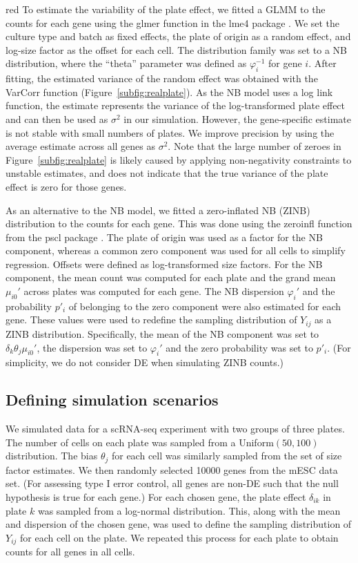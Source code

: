 \documentclass{article}
\begin{document}
\begin{color}{red}
To estimate the variability of the plate effect, we fitted a GLMM to the counts for each gene using the glmer function in the lme4 package \citep{bates2015fitting}.
We set the culture type and batch as fixed effects, the plate of origin as a random effect, and log-size factor as the offset for each cell.
The distribution family was set to a NB distribution, where the ``theta'' parameter was defined as $\varphi_i^{-1}$ for gene $i$.
After fitting, the estimated variance of the random effect was obtained with the VarCorr function (Figure~\ref{subfig:realplate}).
As the NB model uses a log link function, the estimate represents the variance of the log-transformed plate effect and can then be used as $\sigma^2$ in our simulation.
However, the gene-specific estimate is not stable with small numbers of plates.
We improve precision by using the average estimate across all genes as $\sigma^2$.
Note that the large number of zeroes in Figure~\ref{subfig:realplate} is likely caused by applying non-negativity constraints to unstable estimates, and does not indicate that the true variance of the plate effect is zero for those genes. 

As an alternative to the NB model, we fitted a zero-inflated NB (ZINB) distribution to the counts for each gene.
This was done using the zeroinfl function from the pscl package \citep{zeilis2008regression}.
The plate of origin was used as a factor for the NB component, whereas a common zero component was used for all cells to simplify regression.
Offsets were defined as log-transformed size factors.
For the NB component, the mean count was computed for each plate and the grand mean $\mu_{i0}'$ across plates was computed for each gene.
The NB dispersion $\varphi_i'$ and the probability $p'_i$ of belonging to the zero component were also estimated for each gene.
These values were used to redefine the sampling distribution of $Y_{ij}$ as a ZINB distribution.
Specifically, the mean of the NB component was set to $\delta_k\theta_j\mu_{i0}'$, the dispersion was set to $\varphi_i'$ and the zero probability was set to $p'_i$.
(For simplicity, we do not consider DE when simulating ZINB counts.)

\subsection{Defining simulation scenarios}
We simulated data for a scRNA-seq experiment with two groups of three plates.
The number of cells on each plate was sampled from a Uniform$(50, 100)$ distribution.
The bias $\theta_j$ for each cell was similarly sampled from the set of size factor estimates.
We then randomly selected 10000 genes from the mESC data set.
(For assessing type I error control, all genes are non-DE such that the null hypothesis is true for each gene.)
For each chosen gene, the plate effect $\delta_{ik}$ in plate $k$ was sampled from a log-normal distribution.
This, along with the mean and dispersion of the chosen gene, was used to define the sampling distribution of $Y_{ij}$ for each cell on the plate.
We repeated this process for each plate to obtain counts for all genes in all cells.


\end{color}
\end{document}
